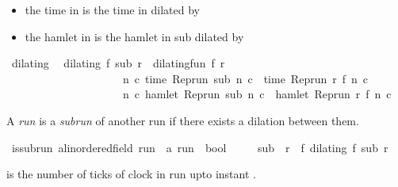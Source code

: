 \begin{isabellebody}
\begin{isamarkuptext}
\begin{itemize}
\item the time in  is the time in  dilated by 

\item the hamlet in  is the hamlet in sub dilated by %
\end{itemize}%
\end{isamarkuptext}\isamarkuptrue%
\isamarkupfalse%
\ dilating\isanewline
{}\isanewline
\ \ {\isacartoucheopen}dilating\ f\ sub\ r\ {\isasymequiv}\ dilating{\isacharunderscore}fun\ f\ r\isanewline
\ \ \ \ \ \ \ \ \ \ \ \ \ \ \ \ \ \ \ \ {\isasymand}\ {\isacharparenleft}{\isasymforall}n\ c{\isachardot}\ time\ {\isacharparenleft}{\isacharparenleft}Rep{\isacharunderscore}run\ sub{\isacharparenright}\ n\ c{\isacharparenright}\ {\isacharequal}\ time\ {\isacharparenleft}{\isacharparenleft}Rep{\isacharunderscore}run\ r{\isacharparenright}\ {\isacharparenleft}f\ n{\isacharparenright}\ c{\isacharparenright}{\isacharparenright}\isanewline
\ \ \ \ \ \ \ \ \ \ \ \ \ \ \ \ \ \ \ \ {\isasymand}\ {\isacharparenleft}{\isasymforall}n\ c{\isachardot}\ hamlet\ {\isacharparenleft}{\isacharparenleft}Rep{\isacharunderscore}run\ sub{\isacharparenright}\ n\ c{\isacharparenright}\ {\isacharequal}\ hamlet\ {\isacharparenleft}{\isacharparenleft}Rep{\isacharunderscore}run\ r{\isacharparenright}\ {\isacharparenleft}f\ n{\isacharparenright}\ c{\isacharparenright}{\isacharparenright}{\isacartoucheclose}%
\begin{isamarkuptext}%
A \emph{run} is a \emph{subrun} of another run if there exists a dilation between them.%
\end{isamarkuptext}\isamarkuptrue%
\isamarkupfalse%
\ is{\isacharunderscore}subrun\ {\isacharcolon}{\isacharcolon}{\isacartoucheopen}{\isacharprime}a{\isacharcolon}{\isacharcolon}linordered{\isacharunderscore}field\ run\ {\isasymRightarrow}\ {\isacharprime}a\ run\ {\isasymRightarrow}\ bool{\isacartoucheclose}\ {\isacharparenleft}\ {\isachardoublequoteopen}{\isasymlless}{\isachardoublequoteclose}\ {}{}{\isacharparenright}\isanewline
{}\isanewline
\ \ {\isacartoucheopen}sub\ {\isasymlless}\ r\ {\isasymequiv}\ {\isacharparenleft}{\isasymexists}f{\isachardot}\ dilating\ f\ sub\ r{\isacharparenright}{\isacartoucheclose}%
\begin{isamarkuptext}%
 is the number of ticks of clock  in 
  run  upto instant .%
\end{isamarkuptext}\isamarkuptrue%

\end{isabellebody}
